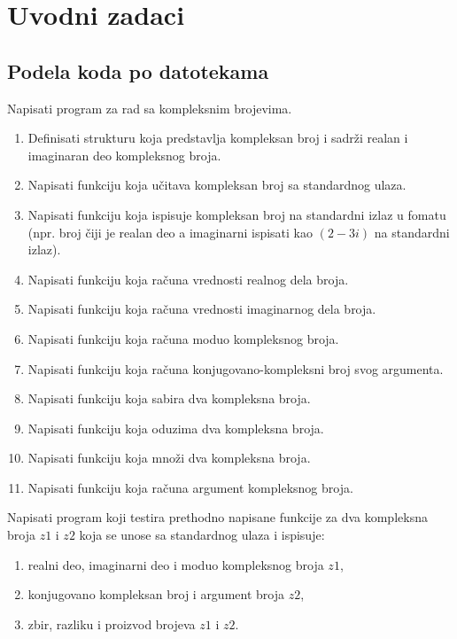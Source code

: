 \chapter{Uvodni zadaci}

\section{Podela koda po datotekama}


\begin{Exercise}[label=001] %
Napisati program za rad sa kompleksnim brojevima.
\begin{enumerate}
\item Definisati strukturu  koja predstavlja kompleksan broj i sadrži realan i imaginaran deo kompleksnog broja.
\item Napisati funkciju  koja učitava kompleksan broj sa standardnog ulaza.
\item Napisati funkciju  koja ispisuje kompleksan broj na standardni izlaz u fomatu (npr. broj čiji je realan deo  a imaginarni  ispisati kao $(2-3i)$ na standardni izlaz).
\item Napisati funkciju  koja računa vrednosti realnog dela broja.
\item Napisati funkciju  koja računa vrednosti imaginarnog dela broja.
\item Napisati funkciju  koja računa moduo kompleksnog broja.
\item Napisati funkciju  koja računa konjugovano-kompleksni broj svog argumenta.
\item Napisati funkciju  koja sabira dva kompleksna broja.
\item Napisati funkciju  koja oduzima dva kompleksna broja.
\item Napisati funkciju  koja množi dva kompleksna broja.
\item Napisati funkciju  koja računa argument kompleksnog broja.
\end{enumerate}
Napisati program koji testira prethodno napisane funkcije za dva kompleksna broja $z1$ i $z2$ koja se unose sa standardnog ulaza i ispisuje:
\begin{enumerate}
\item realni deo, imaginarni deo i moduo kompleksnog broja $z1$,
\item konjugovano kompleksan broj i argument broja $z2$,
\item zbir, razliku i proizvod brojeva $z1$ i $z2$.
\end{enumerate}


\end{Exercise}
